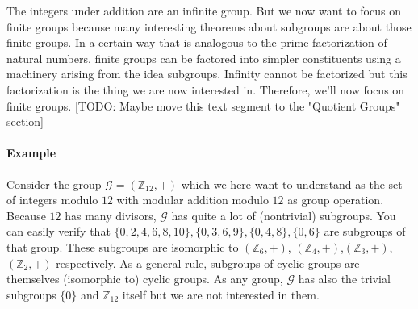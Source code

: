 \medskip
The integers under addition are an infinite group. But we now want to focus on finite groups because many interesting theorems about subgroups are about those finite groups. In a certain way that is analogous to the prime factorization of natural numbers, finite groups can be factored into simpler constituents using a machinery arising from the idea subgroups. Infinity cannot be factorized but this factorization is the thing we are now interested in. Therefore, we'll now focus on finite groups. [TODO: Maybe move this text segment to the "Quotient Groups" section]

\paragraph{Example}
Consider the group $\mathcal{G} = (\mathbb{Z}_{12}, +)$ which we here want to understand as the set of integers modulo $12$ with modular addition modulo $12$ as group operation. Because $12$ has many divisors, $\mathcal{G}$ has quite a lot of (nontrivial) subgroups. You can easily verify that $\{0,2,4,6,8,10\}, \{0,3,6,9\}, \{0,4,8\}, \{0,6\}$ are subgroups of that group. These subgroups are isomorphic to $(\mathbb{Z}_{6}, +)$, $(\mathbb{Z}_{4}, +)$,$(\mathbb{Z}_{3}, +)$, $(\mathbb{Z}_{2}, +)$ respectively. As a general rule, subgroups of cyclic groups are themselves (isomorphic to) cyclic groups. As any group, $\mathcal{G}$ has also the trivial subgroups $\{ 0 \}$ and $\mathbb{Z}_{12}$ itself but we are not interested in them. 






